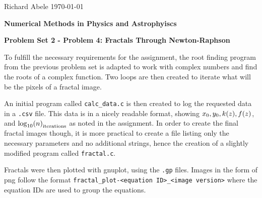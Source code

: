 \documentclass[12pt]{article}
\DeclarePairedDelimiter\rb{(}{)}
\begin{document}
\noindent Richard Abele \hfill \today \\[30pt]
\centerline{ \Large{ \textbf{ Numerical Methods in Physics and Astrophyiscs }}}
\centerline{ \Large{ \textbf{ Problem Set 2 - Problem 4: Fractals Through Newton-Raphson }}}

To fulfill the necessary requirements for the assignment, the root finding program from the previous problem set is adapted to work with complex numbers and find the roots of a complex function. Two loops are then created to iterate what will be the pixels of a fractal image. 

An initial program called \texttt{calc_data.c} is then created to log the requested data in a \texttt{.csv} file. This data is in a nicely readable format, showing \(x_{0}, y_{0}, k\rb*{z}, f\rb*{z}\), and \(\log_{10}\rb*{n}_{\text{iterations} }\) as noted in the assignment. In order to create the final fractal images though, it is more practical to create a file listing only the necessary parameters and no additional strings, hence the creation of a slightly modified program called \texttt{fractal.c}.

Fractals were then plotted with gnuplot, using the \texttt{.gp} files. Images in the form of png follow the format \texttt{fractal_plot-<equation ID>_<image version>} where the equation IDs are used to group the equations. 
\end{document}
